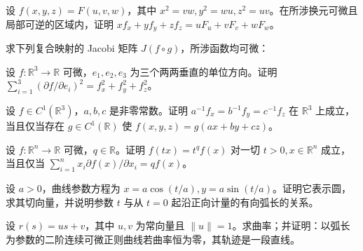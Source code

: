 \newpage
\noindent\begin{minipage}{\textwidth}
设 $f(x,y,z)=F(u,v,w)$，其中 $x^2=vw,y^2=wu,z^2=uv$。在所涉换元可微且局部可逆的区域内，证明 $xf_x+yf_y+zf_z=uF_u+vF_v+wF_w$。
\end{minipage}\par\vfill
\noindent\begin{minipage}{\textwidth}
求下列复合映射的 Jacobi 矩阵 $J(f\circ g)$，所涉函数均可微：
\end{minipage}\par\vfill
\noindent\begin{minipage}{\textwidth}
设 $f:\mathbb R^3\to\mathbb R$ 可微，$e_1,e_2,e_3$ 为三个两两垂直的单位方向。证明 $\sum_{i=1}^3(\partial f/\partial e_i)^2=f_x^2+f_y^2+f_z^2$。
\end{minipage}\par\vfill
\newpage
\noindent\begin{minipage}{\textwidth}
设 $f\in C^1(\mathbb R^3)$，$a,b,c$ 是非零常数。证明 $a^{-1}f_x=b^{-1}f_y=c^{-1}f_z$ 在 $\mathbb R^3$ 上成立，当且仅当存在 $g\in C^1(\mathbb R)$ 使 $f(x,y,z)=g(ax+by+cz)$。
\end{minipage}\par\vfill
\noindent\begin{minipage}{\textwidth}
设 $f:\mathbb R^n\to\mathbb R$ 可微，$q\in\mathbb R$。证明 $f(tx)=t^qf(x)$ 对一切 $t>0,x\in\mathbb R^n$ 成立，当且仅当 $\sum_{i=1}^n x_i\partial f(x)/\partial x_i=qf(x)$。
\end{minipage}\par\vfill
\noindent\begin{minipage}{\textwidth}
设 $a>0$，曲线参数方程为 $x=a\cos(t/a),y=a\sin(t/a)$。证明它表示圆，求其切向量，并说明参数 $t$ 与从 $t=0$ 起沿正向计量的有向弧长的关系。
\end{minipage}\par\vfill
\newpage
\noindent\begin{minipage}{\textwidth}
设 $r(s)=us+v$，其中 $u,v$ 为常向量且 $\|u\|=1$。求曲率；并证明：以弧长为参数的二阶连续可微正则曲线若曲率恒为零，其轨迹是一段直线。
\end{minipage}\par\vfill
